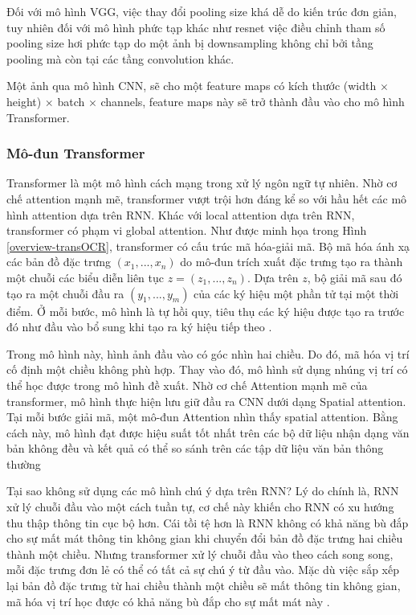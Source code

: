 Đối với mô hình VGG, việc thay đổi pooling size khá dễ do kiến trúc đơn giản, tuy nhiên đối với mô hình phức tạp khác như resnet việc điều chỉnh tham số pooling size hơi phức tạp do một ảnh bị downsampling không chỉ bởi tầng pooling mà còn tại các tầng convolution khác.

Một ảnh qua mô hình CNN, sẽ cho một feature maps có kích thước (width $\times$ height) $\times$ batch $\times$ channels, feature maps này sẽ trở thành đầu vào cho mô hình Transformer.

\subsubsection*{Mô-đun Transformer}
Transformer là một mô hình cách mạng trong xử lý ngôn ngữ tự nhiên. Nhờ cơ chế attention mạnh mẽ, transformer vượt trội hơn đáng kể so với hầu hết các mô hình attention dựa trên RNN. Khác với local attention dựa trên RNN, transformer có phạm vi global attention. Như được minh họa trong Hình \ref{overview-transOCR}, transformer có cấu trúc mã hóa-giải mã. Bộ mã hóa ánh xạ các bản đồ đặc trưng $(x_1, ..., x_{n})$ do mô-đun trích xuất đặc trưng tạo ra thành một chuỗi các biểu diễn liên tục $z = (z_1, ..., z_{n})$. Dựa trên $z$, bộ giải mã sau đó tạo ra một chuỗi đầu ra $(y_1, ..., y_m)$ của các ký hiệu một phần tử tại một thời điểm. Ở mỗi bước, mô hình là tự hồi quy, tiêu thụ các ký hiệu được tạo ra trước đó như đầu vào bổ sung khi tạo ra ký hiệu tiếp theo \cite{feng2020scene}.

Trong mô hình này, hình ảnh đầu vào có góc nhìn hai chiều. Do đó, mã hóa vị trí cố định một chiều không phù hợp. Thay vào đó, mô hình sử dụng nhúng vị trí có thể học được trong mô hình đề xuất. Nhờ cơ chế Attention mạnh mẽ của transformer, mô hình thực hiện lưu giữ đầu ra CNN dưới dạng Spatial attention. Tại mỗi bước giải mã, một mô-đun Attention nhìn thấy spatial attention. Bằng cách này, mô hình đạt được hiệu suất tốt nhất trên các bộ dữ liệu nhận dạng văn bản không đều và kết quả có thể so sánh trên các tập dữ liệu văn bản thông thường

Tại sao không sử dụng các mô hình chú ý dựa trên RNN? Lý do chính là, RNN xử lý chuỗi đầu vào một cách tuần tự, cơ chế này khiến cho RNN có xu hướng thu thập thông tin cục bộ hơn. Cái tồi tệ hơn là RNN không có khả năng bù đắp cho sự mất mát thông tin không gian khi chuyển đổi bản đồ đặc trưng hai chiều thành một chiều. Nhưng transformer xử lý chuỗi đầu vào theo cách song song, mỗi đặc trưng đơn lẻ có thể có tất cả sự chú ý từ đầu vào. Mặc dù việc sắp xếp lại bản đồ đặc trưng từ hai chiều thành một chiều sẽ mất thông tin không gian, mã hóa vị trí học được có khả năng bù đắp cho sự mất mát này \cite{feng2020scene}.

